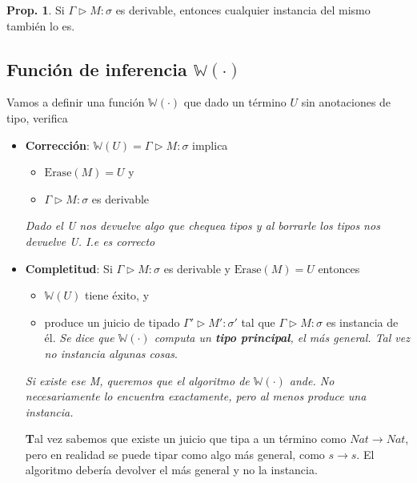 \documentclass{report}
\theoremstyle{definition} %
\newtheorem{proposition}{Prop.}[chapter]
\newenvironment{nota}[1]
    {\begin{leftbar}\textbf{#1}}
    {\end{leftbar}}
\newcommand{\tfunc}[2]{#1 \to #2}
\newcommand{\tipa}[3]{#1 \rhd #2 : #3} %
\newcommand{\Gtipa}[2]{\tipa{\Gamma}{#1}{#2}}
\newcommand{\erase}[1]{\text{Erase}(#1)}
\newcommand{\GTipaInst}[2]{\tipa{\Gamma'}{#1'}{#2'}} %
\newcommand{\infer}[1]{\mathbb{W}(#1)}
\begin{document}
\begin{proposition}
    Si $\Gtipa{M}{\sigma}$ es derivable, entonces cualquier instancia del mismo
    también lo es.
\end{proposition}

\subsection{Función de inferencia $\infer{\cdot}$}

Vamos a definir una función $\infer{\cdot}$ que dado un término $U$ sin
anotaciones de tipo, verifica

\begin{itemize}
    \item \textbf{Corrección}: $\infer{U} = \Gtipa{M}{\sigma}$ implica
    \begin{itemize}
        \item $\erase{M} = U$ y
        \item $\Gtipa{M}{\sigma}$ es derivable
    \end{itemize}

    \textit{Dado el U nos devuelve algo que chequea tipos y al borrarle los tipos nos devuelve U. I.e es correcto}

    \item \textbf{Completitud}: Si $\Gtipa{M}{\sigma}$ es derivable y $\erase{M}
    = U$ entonces

    \begin{itemize}
        \item $\infer{U}$ tiene éxito, y
        \item produce un juicio de tipado $\GTipaInst{M}{\sigma}$ tal que
        $\Gtipa{M}{\sigma}$ es instancia de él. \textit{Se dice que
        $\infer{\cdot}$ computa un \textbf{tipo principal}, el más general. Tal
        vez no instancia algunas cosas}.
    \end{itemize}

    \textit{Si existe ese M, queremos que el algoritmo de $\infer{\cdot}$ ande.
   No necesariamente lo encuentra exactamente, pero al menos produce una
   instancia.}

   \begin{nota}
       Tal vez sabemos que existe un juicio que tipa a un término como
       $\tfunc{Nat}{Nat}$, pero en realidad se puede tipar como algo más
       general, como $\tfunc{s}{s}$. El algoritmo debería devolver el más
       general y no la instancia.
   \end{nota}
\end{itemize}
\end{document}
